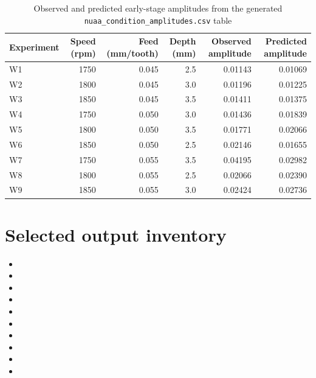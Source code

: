 \documentclass[11pt,a4paper]{article}
\newcommand{\code}[1]{\texttt{#1}}
\begin{document}
\begin{table}[H]
\centering
\small
\caption{Observed and predicted early-stage amplitudes from the generated \code{nuaa\_condition\_amplitudes.csv} table}
\begin{tabular}{lrrrrr}
\toprule
Experiment & Speed (rpm) & Feed (mm/tooth) & Depth (mm) & Observed amplitude & Predicted amplitude \\
\midrule
W1 & 1750 & 0.045 & 2.5 & 0.01143 & 0.01069 \\
W2 & 1800 & 0.045 & 3.0 & 0.01196 & 0.01225 \\
W3 & 1850 & 0.045 & 3.5 & 0.01411 & 0.01375 \\
W4 & 1750 & 0.050 & 3.0 & 0.01436 & 0.01839 \\
W5 & 1800 & 0.050 & 3.5 & 0.01771 & 0.02066 \\
W6 & 1850 & 0.050 & 2.5 & 0.02146 & 0.01655 \\
W7 & 1750 & 0.055 & 3.5 & 0.04195 & 0.02982 \\
W8 & 1800 & 0.055 & 2.5 & 0.02066 & 0.02390 \\
W9 & 1850 & 0.055 & 3.0 & 0.02424 & 0.02736 \\
\bottomrule
\end{tabular}
\end{table}

\section{Selected output inventory}

\begin{itemize}[leftmargin=1.6em]
\item {}
\item {}
\item {}
\item {}
\item {}
\item {}
\item {}
\item {}
\item {}
\item {}
\end{itemize}
\end{document}
